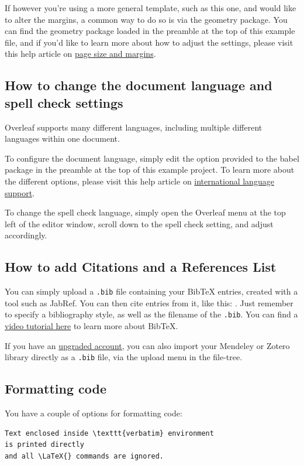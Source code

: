 \documentclass{article}
\begin{document}
If however you're using a more general template, such as this one, and would like to alter the margins, a common way to do so is via the geometry package. You can find the geometry package loaded in the preamble at the top of this example file, and if you'd like to learn more about how to adjust the settings, please visit this help article on \href{https://www.overleaf.com/learn/latex/page_size_and_margins}{page size and margins}.

\subsection{How to change the document language and spell check settings}

Overleaf supports many different languages, including multiple different languages within one document. 

To configure the document language, simply edit the option provided to the babel package in the preamble at the top of this example project. To learn more about the different options, please visit this help article on \href{https://www.overleaf.com/learn/latex/International_language_support}{international language support}.

To change the spell check language, simply open the Overleaf menu at the top left of the editor window, scroll down to the spell check setting, and adjust accordingly.

\subsection{How to add Citations and a References List}

You can simply upload a \verb|.bib| file containing your BibTeX entries, created with a tool such as JabRef. You can then cite entries from it, like this: \cite{greenwade93}. Just remember to specify a bibliography style, as well as the filename of the \verb|.bib|. You can find a \href{https://www.overleaf.com/help/97-how-to-include-a-bibliography-using-bibtex}{video tutorial here} to learn more about BibTeX.

If you have an \href{https://www.overleaf.com/user/subscription/plans}{upgraded account}, you can also import your Mendeley or Zotero library directly as a \verb|.bib| file, via the upload menu in the file-tree.

\subsection{Formatting code}
You have a couple of options for formatting code:
\begin{verbatim}
Text enclosed inside \texttt{verbatim} environment 
is printed directly 
and all \LaTeX{} commands are ignored.
\end{verbatim}
\end{document}
